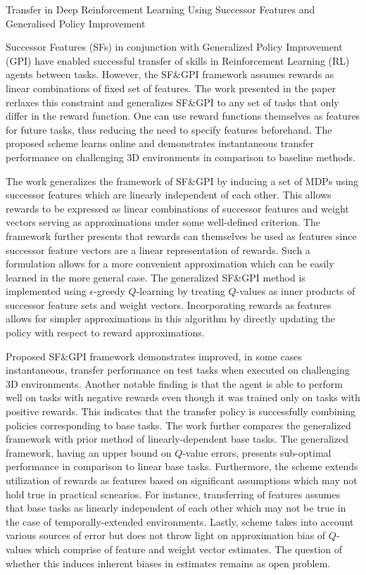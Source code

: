 \documentclass[11pt,letterpaper]{article}
\begin{document}
\begin{center}
  \large{Transfer in Deep Reinforcement Learning Using Successor Features and Generalised Policy Improvement}
\end{center}

Successor Features (SFs) in conjunction with Generalized Policy Improvement (GPI) have enabled successful transfer of skills in Reinforcement Learning (RL) agents between tasks. However, the SF\&GPI framework assumes rewards as linear combinations of fixed set of features. The work presented in the paper rerlaxes this constraint and generalizes SF\&GPI to any set of tasks that only differ in the reward function. One can use reward functions themselves as features for future tasks, thus reducing the need to specify features beforehand. The proposed scheme learns online and demonstrates instantaneous transfer performance on challenging 3D environments in comparison to baseline methods. 

The work generalizes the framework of SF\&GPI by inducing a set of MDPs using successor features which are linearly independent of each other. This allows rewards to be expressed as linear combinations of successor features and weight vectors serving as approximations under some well-defined criterion. The framework further presents that rewards can themselves be used as features since successor feature vectors are a linear representation of rewards. Such a formulation allows for a more convenient approximation which can be easily learned in the more general case. The generalized SF\&GPI method is implemented using $\epsilon$-greedy $Q$-learning by treating $Q$-values as inner products of successor feature sets and weight vectors. Incorporating rewards as features allows for simpler approximations in this algorithm by directly updating the policy with respect to reward approximations. 

Proposed SF\&GPI framework demonstrates improved, in some cases instantaneous, transfer performance on test tasks when executed on challenging 3D environments. Another notable finding is that the agent is able to perform well on tasks with negative rewards even though it was trained only on tasks with positive rewards. This indicates that the transfer policy is successfully combining policies corresponding to base tasks. The work further compares the generalized framework with prior method of linearly-dependent base tasks. The generalized framework, having an upper bound on $Q$-value errors, presents sub-optimal performance in comparison to linear base tasks. Furthermore, the scheme extends utilization of rewards as features based on significant assumptions which may not hold true in practical scnearios. For instance, transferring of features assumes that base tasks as linearly independent of each other which may not be true in the case of temporally-extended environments. Lastly, scheme takes into account various sources of error but does not throw light on approximation bias of $Q$-values which comprise of feature and weight vector estimates. The question of whether this induces inherent biases in estimates remains as open problem. 
\end{document}
